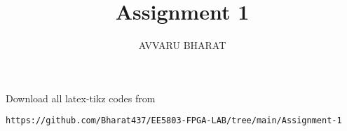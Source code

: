 \documentclass{article}
\DeclareMathOperator*{\Res}{Res}
\begin{document}
\newtheorem{theorem}{Theorem}[section]
\newtheorem{problem}{Problem}
\newtheorem{proposition}{Proposition}[section]
\newtheorem{lemma}{Lemma}[section]
\newtheorem{corollary}[theorem]{Corollary}
\newtheorem{example}{Example}[section]
\newtheorem{definition}[problem]{Definition}

\newcommand{\BEQA}{\begin{eqnarray}}
\newcommand{\EEQA}{\end{eqnarray}}
\newcommand{\define}{\stackrel{\triangle}{=}}

\providecommand{\mbf}{\mathbf}
\providecommand{\pr}[1]{\ensuremath{\Pr\left(#1\right)}}
\providecommand{\qfunc}[1]{\ensuremath{Q\left(#1\right)}}
\providecommand{\sbrak}[1]{\ensuremath{{}\left[#1\right]}}
\providecommand{\lsbrak}[1]{\ensuremath{{}\left[#1\right.}}
\providecommand{\rsbrak}[1]{\ensuremath{{}\left.#1\right]}}
\providecommand{\brak}[1]{\ensuremath{\left(#1\right)}}
\providecommand{\lbrak}[1]{\ensuremath{\left(#1\right.}}
\providecommand{\rbrak}[1]{\ensuremath{\left.#1\right)}}
\providecommand{\cbrak}[1]{\ensuremath{\left\{#1\right\}}}
\providecommand{\lcbrak}[1]{\ensuremath{\left\{#1\right.}}
\providecommand{\rcbrak}[1]{\ensuremath{\left.#1\right\}}}
\theoremstyle{remark}
\newtheorem{rem}{Remark}
\newcommand{\sgn}{\mathop{\mathrm{sgn}}}
\providecommand{\res}[1]{\Res\displaylimits_{#1}} 
\providecommand{\mtx}[1]{\mathbf{#1}}
\providecommand{\fourier}{\overset{\mathcal{F}}{ \rightleftharpoons}}
\providecommand{\system}{\overset{\mathcal{H}}{ \longleftrightarrow}}
\newcommand{\solution}{\noindent \textbf{Solution: }}
\newcommand{\cosec}{\,\text{cosec}\,}
\providecommand{\dec}[2]{\ensuremath{\overset{#1}{\underset{#2}{\gtrless}}}}
\newcommand{\myvec}[1]{\ensuremath{\begin{pmatrix}#1\end{pmatrix}}}
\newcommand{\mydet}[1]{\ensuremath{\begin{vmatrix}#1\end{vmatrix}}}
\makeatletter
{}
\makeatother
\let\StandardTheFigure\thefigure
\let\vec\mathbf
\renewcommand{\thefigure}{\theproblem}
\def\putbox#1#2#3{\makebox[0in][l]{\makebox[#1][l]{}\raisebox{\baselineskip}[0in][0in]{\raisebox{#2}[0in][0in]{#3}}}}
     \def\rightbox#1{\makebox[0in][r]{#1}}
     \def\centbox#1{\makebox[0in]{#1}}
     \def\topbox#1{\raisebox{-\baselineskip}[0in][0in]{#1}}
     \def\midbox#1{\raisebox{-0.5\baselineskip}[0in][0in]{#1}}
\vspace{3cm}
\title{Assignment 1}
\author{AVVARU BHARAT}
\date{}
\maketitle
\renewcommand\thefigure{\arabic{figure}}
\setcounter{figure}{0}
Download all latex-tikz codes from 
%
\begin{lstlisting}
https://github.com/Bharat437/EE5803-FPGA-LAB/tree/main/Assignment-1
\end{lstlisting}
%
\end{document}
